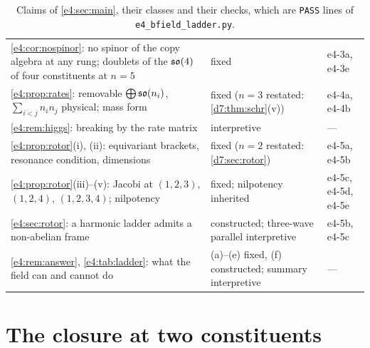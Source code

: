 \begin{table}[htbp]
\begin{tabular}{@{}>{\raggedright\arraybackslash}p{8.0cm}>{\raggedright\arraybackslash}p{4.8cm}>{\raggedright\arraybackslash}p{2.0cm}@{}}
\cref{e4:cor:nospinor}: no spinor of the copy algebra at any rung; doublets of the $\mathfrak{so}(4)$ of four constituents at $n=5$ & fixed & e4-3a, e4-3e\\
\cref{e4:prop:rates}: removable $\bigoplus\mathfrak{so}(n_i)$, $\sum_{i<j}n_in_j$ physical; mass form & fixed ($n=3$ restated: \cref{d7:thm:schr}(v)) & e4-4a, e4-4b\\
\cref{e4:rem:higgs}: breaking by the rate matrix & interpretive & ---\\
\cref{e4:prop:rotor}(i), (ii): equivariant brackets, resonance condition, dimensions & fixed ($n=2$ restated: \cref{d7:sec:rotor}) & e4-5a, e4-5b\\
\cref{e4:prop:rotor}(iii)--(v): Jacobi at $(1,2,3)$, $(1,2,4)$, $(1,2,3,4)$; nilpotency & fixed; nilpotency inherited & e4-5c, e4-5d, e4-5e\\
\cref{e4:sec:rotor}: a harmonic ladder admits a non-abelian frame & constructed; three-wave parallel interpretive & e4-5b, e4-5c\\
\cref{e4:rem:answer}, \cref{e4:tab:ladder}: what the field can and cannot do & (a)--(e) fixed, (f) constructed; summary interpretive & ---\\
\bottomrule
\end{tabular}
\caption{Claims of \cref{e4:sec:main}, their classes and their checks, which are \texttt{PASS} lines of \texttt{e4\_bfield\_ladder.py}.}
\label{e4:tab:claims}
\end{table}


\section{The closure at two constituents}
\label{e5:sec:main}

